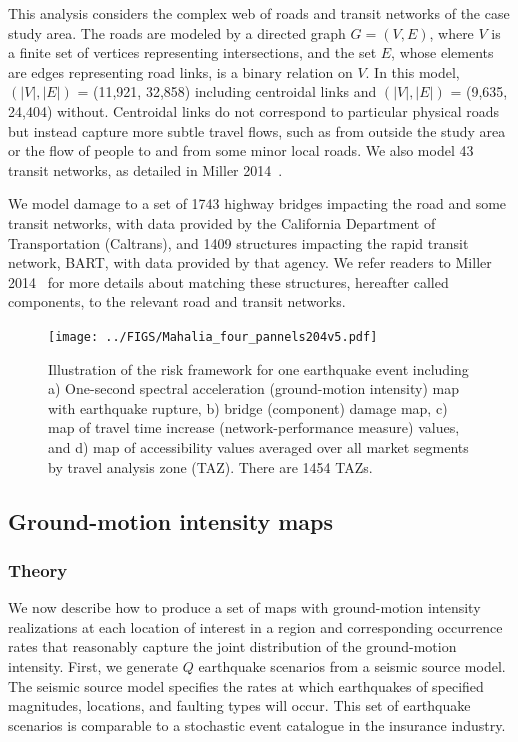 This analysis considers the complex web of roads and transit networks of the case study area. The roads are modeled by a directed graph $G = (V, E)$, where $V$ is a finite set of vertices representing intersections, and the set $E$, whose elements are edges representing road links, is a binary relation on $V$. In this model, $(|V|, |E|)$ = (11,921, 32,858) including centroidal links and $(|V|, |E|)$ = (9,635, 24,404) without. Centroidal links do not correspond to particular physical roads but instead capture more subtle travel flows, such as  from outside the study area or the flow of people to and from some minor local roads. We also model 43 transit networks, as detailed in Miller 2014~\cite{miller_seismic_2014}.

We  model damage to a set of 1743 highway bridges impacting the road and some transit networks, with data provided by the California Department of Transportation (Caltrans), and 1409 structures impacting the rapid transit network, BART, with data provided by that agency. We refer readers to Miller 2014~\cite{miller_seismic_2014} for more details about matching these structures, hereafter called components, to the relevant road and transit networks.


\begin{figure}
\centering
\texttt{[image: ../FIGS/Mahalia\_four\_pannels204v5.pdf]} %
\caption{Illustration of the risk framework for one earthquake event including a) One-second spectral acceleration  (ground-motion intensity) map with earthquake rupture, b) bridge (component) damage map, c) map of travel time increase (network-performance measure) values, and d) map of accessibility values averaged over all market segments by travel analysis zone (TAZ). There are 1454 TAZs.}
\label{fig:four_steps}\end{figure}

\subsection{Ground-motion intensity maps}
\subsubsection{Theory}
We now describe how to produce a set of maps with ground-motion intensity realizations at each location of interest in a region and corresponding occurrence rates that reasonably capture the joint distribution of the ground-motion intensity. First, we generate $Q$ earthquake scenarios from a seismic source model. The seismic source model specifies the rates at which earthquakes of specified magnitudes, locations, and faulting types will occur. This set of earthquake scenarios is comparable to a stochastic event catalogue in the insurance industry.


